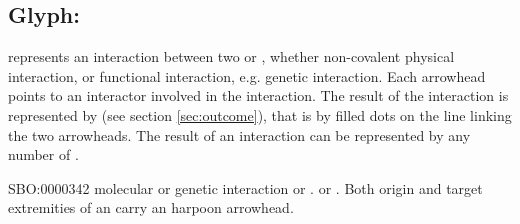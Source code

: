 \color{blue}

\subsection{Glyph: }\label{sec:interaction}

 represents an interaction between two  or , whether non-covalent physical interaction, or functional interaction, e.g. genetic interaction. Each arrowhead points to an interactor involved in the interaction. The result of the interaction is represented by  (see section \ref{sec:outcome}), that is by filled dots on the line linking the two arrowheads. The result of an interaction can be represented by any number of .

\begin{glyphDescription}
 \glyphSboTerm SBO:0000342 molecular or genetic interaction
 \glyphOrigin {}  or  .
 \glyphTarget {}  or  .
 \glyphEndPoint Both origin and target extremities of an  carry an harpoon arrowhead.
 \end{glyphDescription}

\begin{center}
\end{center}
% 
% 
\normalcolor

\newpage